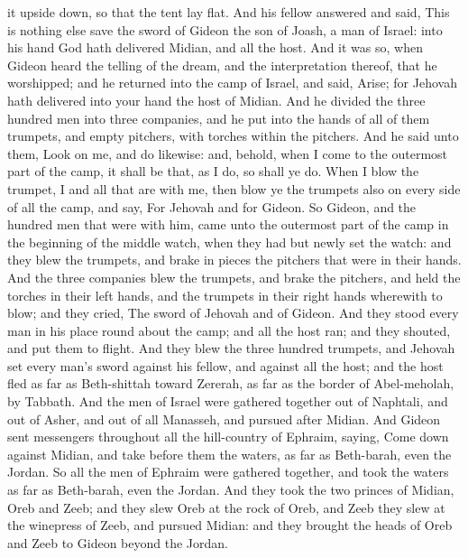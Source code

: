 it upside down, so that the tent lay flat. And his fellow answered and said, This is nothing else save the sword of Gideon the son of Joash, a man of Israel: into his hand God hath delivered Midian, and all the host.  And it was so, when Gideon heard the telling of the dream, and the interpretation thereof, that he worshipped; and he returned into the camp of Israel, and said, Arise; for Jehovah hath delivered into your hand the host of Midian. And he divided the three hundred men into three companies, and he put into the hands of all of them trumpets, and empty pitchers, with torches within the pitchers. And he said unto them, Look on me, and do likewise: and, behold, when I come to the outermost part of the camp, it shall be that, as I do, so shall ye do. When I blow the trumpet, I and all that are with me, then blow ye the trumpets also on every side of all the camp, and say, For Jehovah and for Gideon.  So Gideon, and the hundred men that were with him, came unto the outermost part of the camp in the beginning of the middle watch, when they had but newly set the watch: and they blew the trumpets, and brake in pieces the pitchers that were in their hands. And the three companies blew the trumpets, and brake the pitchers, and held the torches in their left hands, and the trumpets in their right hands wherewith to blow; and they cried, The sword of Jehovah and of Gideon. And they stood every man in his place round about the camp; and all the host ran; and they shouted, and put them to flight. And they blew the three hundred trumpets, and Jehovah set every man’s sword against his fellow, and against all the host; and the host fled as far as Beth-shittah toward Zererah, as far as the border of Abel-meholah, by Tabbath. And the men of Israel were gathered together out of Naphtali, and out of Asher, and out of all Manasseh, and pursued after Midian.  And Gideon sent messengers throughout all the hill-country of Ephraim, saying, Come down against Midian, and take before them the waters, as far as Beth-barah, even the Jordan. So all the men of Ephraim were gathered together, and took the waters as far as Beth-barah, even the Jordan. And they took the two princes of Midian, Oreb and Zeeb; and they slew Oreb at the rock of Oreb, and Zeeb they slew at the winepress of Zeeb, and pursued Midian: and they brought the heads of Oreb and Zeeb to Gideon beyond the Jordan. 

